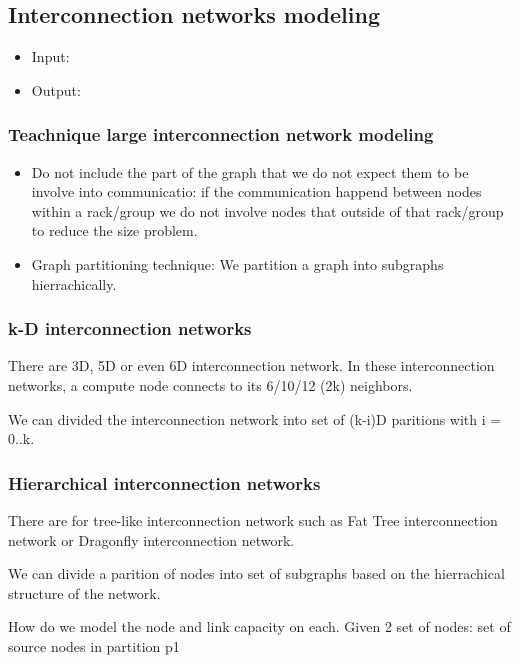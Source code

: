 \documentclass[letter]{article}
\begin{document}
\subsection {Interconnection networks modeling}
\begin{itemize}
\item Input:
\item Output:
\end{itemize}

\subsubsection{Teachnique large interconnection network  modeling}
\begin{itemize}
\item Do not include the part of the graph that we do not expect them to be involve into communicatio: if the communication happend between nodes within a rack/group we do not involve nodes that outside of that rack/group to reduce the size problem.
\item Graph partitioning technique: We partition a graph into subgraphs hierrachically.
\end{itemize}

\subsubsection{k-D interconnection networks}
There are 3D, 5D or even 6D interconnection network. In these interconnection networks, a compute node connects to its 6/10/12 (2k) neighbors. %

We can divided the interconnection network into set of (k-i)D paritions with i = 0..k.

\subsubsection{Hierarchical interconnection networks}
There are for tree-like interconnection network such as Fat Tree interconnection network or Dragonfly interconnection network. 

We can divide a parition of nodes into set of subgraphs based on the hierrachical structure of the network.

How do we model the node and link capacity on each. Given 2 set of nodes: set of source nodes in partition p1
\end{document}
